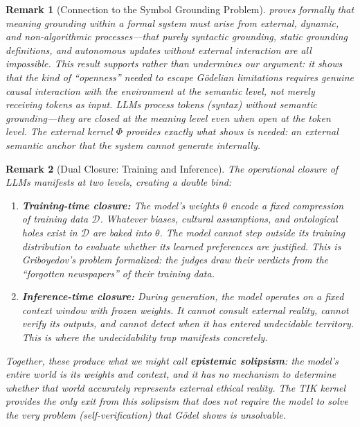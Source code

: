 \documentclass[11pt]{article}
\newtheorem{remark}{Remark}
\begin{document}
\begin{remark}[Connection to the Symbol Grounding Problem]
\label{rem:grounding-connection}
\citet{liu2025grounding} proves formally that meaning grounding within a
formal system must arise from external, dynamic, and non-algorithmic
processes---that purely syntactic grounding, static grounding definitions, and
autonomous updates without external interaction are all impossible. This
result \textit{supports} rather than undermines our argument: it shows that
the kind of ``openness'' needed to escape G\"{o}delian limitations requires
genuine causal interaction with the environment at the semantic level, not
merely receiving tokens as input. LLMs process tokens (syntax) without
semantic grounding---they are closed at the meaning level even when open at
the token level. The external kernel $\Phi$ provides exactly what
\citet{liu2025grounding} shows is needed: an external semantic anchor that
the system cannot generate internally.
\end{remark}

\begin{remark}[Dual Closure: Training and Inference]
\label{rem:dual-closure}
The operational closure of LLMs manifests at two levels, creating a
\textit{double bind}:
\begin{enumerate}
\item \textbf{Training-time closure:} The model's weights $\theta$ encode a
      fixed compression of training data $\mathcal{D}$. Whatever biases,
      cultural assumptions, and ontological holes exist in $\mathcal{D}$ are
      baked into $\theta$. The model cannot step outside its training
      distribution to evaluate whether its learned preferences are justified.
      This is Griboyedov's problem formalized: the judges draw their verdicts
      from the ``forgotten newspapers'' of their training data.
\item \textbf{Inference-time closure:} During generation, the model operates
      on a fixed context window with frozen weights. It cannot consult
      external reality, cannot verify its outputs, and cannot detect when it
      has entered undecidable territory. This is where the undecidability trap
      manifests concretely.
\end{enumerate}
Together, these produce what we might call \textbf{epistemic solipsism}: the
model's entire world is its weights and context, and it has no mechanism to
determine whether that world accurately represents external ethical reality.
The TIK kernel provides the only exit from this solipsism that does not
require the model to solve the very problem (self-verification) that G\"{o}del
shows is unsolvable.
\end{remark}
\end{document}
